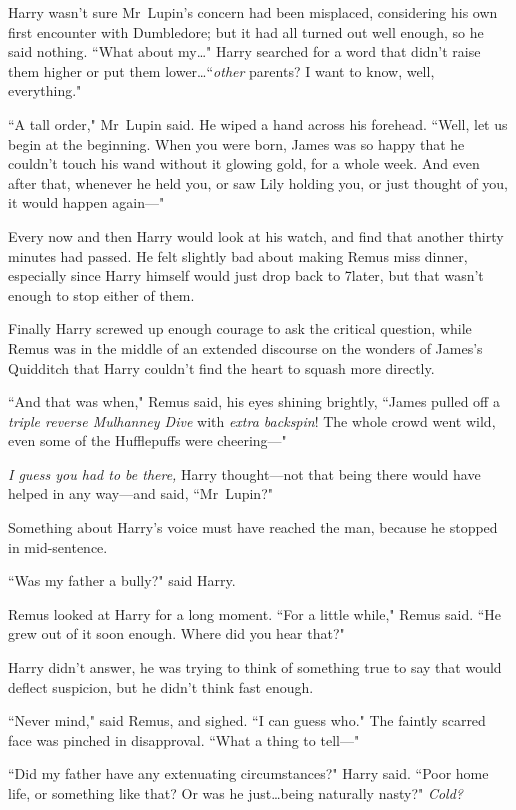 Harry wasn't sure Mr~Lupin's concern had been misplaced, considering his own first encounter with Dumbledore; but it had all turned out well enough, so he said nothing. ``What about my…" Harry searched for a word that didn't raise them higher or put them lower…``\emph{other} parents? I want to know, well, everything."

``A tall order," Mr~Lupin said. He wiped a hand across his forehead. ``Well, let us begin at the beginning. When you were born, James was so happy that he couldn't touch his wand without it glowing gold, for a whole week. And even after that, whenever he held you, or saw Lily holding you, or just thought of you, it would happen again—"

\later

Every now and then Harry would look at his watch, and find that another thirty minutes had passed. He felt slightly bad about making Remus miss dinner, especially since Harry himself would just drop back to 7\pm later, but that wasn't enough to stop either of them.

Finally Harry screwed up enough courage to ask the critical question, while Remus was in the middle of an extended discourse on the wonders of James's Quidditch that Harry couldn't find the heart to squash more directly.

``And that was when," Remus said, his eyes shining brightly, ``James pulled off a \emph{triple reverse Mulhanney Dive} with \emph{extra backspin}! The whole crowd went wild, even some of the Hufflepuffs were cheering—"

\emph{I guess you had to be there,} Harry thought—not that being there would have helped in any way—and said, ``Mr~Lupin?"

Something about Harry's voice must have reached the man, because he stopped in mid-sentence.

``Was my father a bully?" said Harry.

Remus looked at Harry for a long moment. ``For a little while," Remus said. ``He grew out of it soon enough. Where did you hear that?"

Harry didn't answer, he was trying to think of something true to say that would deflect suspicion, but he didn't think fast enough.

``Never mind," said Remus, and sighed. ``I can guess who." The faintly scarred face was pinched in disapproval. ``What a thing to tell—"

``Did my father have any extenuating circumstances?" Harry said. ``Poor home life, or something like that? Or was he just…being naturally nasty?" \emph{Cold?}

